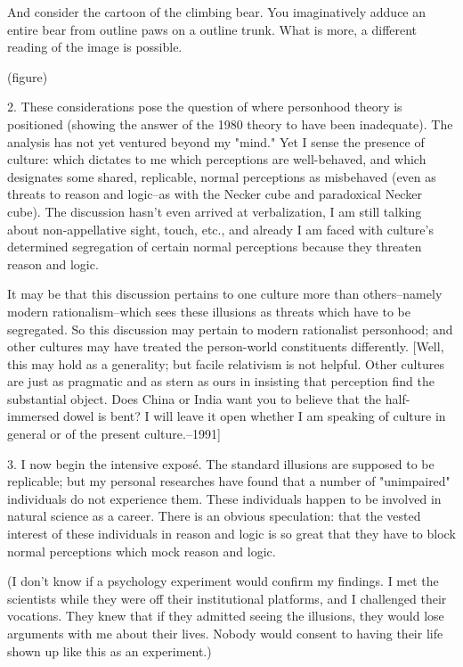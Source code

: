 And consider the cartoon of the climbing bear. You imaginatively adduce an entire bear from outline paws on a outline trunk. What is more, a different reading of the image is possible.

(figure)

2. These considerations pose the question of where personhood theory is positioned (showing the answer of the 1980 theory to have been inadequate). The analysis has not yet ventured beyond my "mind." Yet I sense the presence of culture: which dictates to me which perceptions are well-behaved, and which designates some shared, replicable, normal perceptions as misbehaved (even as threats to reason and logic--as with the Necker cube and paradoxical Necker cube). The discussion hasn't even arrived at verbalization, I am still talking about non-appellative sight, touch, etc., and already I am faced with culture's determined segregation of certain normal perceptions because they threaten reason and logic.

It may be that this discussion pertains to one culture more than others--namely modern rationalism--which sees these illusions as threats which have to be segregated. So this discussion may pertain to modern rationalist personhood; and other cultures may have treated the person-world constituents differently. [Well, this may hold as a generality; but facile relativism is not helpful. Other cultures are just as pragmatic and as stern as ours in insisting that perception find the substantial object. Does China or India want you to believe that the half-immersed dowel is bent? I will leave it open whether I am speaking of culture in general or of the present culture.--1991]

3. I now begin the intensive exposé. The standard illusions are supposed to be replicable; but my personal researches have found that a number of "unimpaired" individuals do not experience them. These individuals happen to be involved in natural science as a career. There is an obvious speculation: that the vested interest of these individuals in reason and logic is so great that they have to block normal perceptions which mock reason and logic.

(I don't know if a psychology experiment would confirm my findings. I met the scientists while they were off their institutional platforms, and I challenged their vocations. They knew that if they admitted seeing the illusions, they would lose arguments with me about their lives. Nobody would consent to having their life shown up like this as an experiment.)

